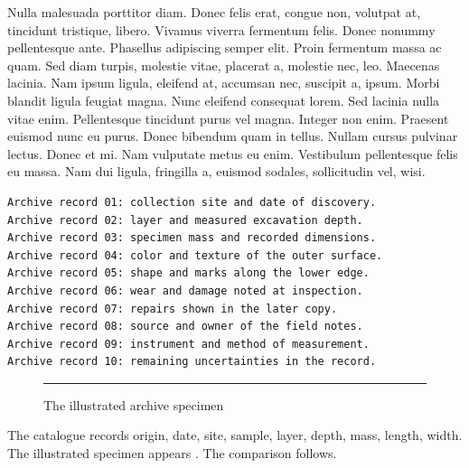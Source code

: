 \documentclass{article}
\begin{document}
Nulla malesuada porttitor diam. Donec felis erat, congue non, volutpat
at, tincidunt tristique, libero. Vivamus viverra fermentum felis. Donec
nonummy pellentesque ante. Phasellus adipiscing semper elit. Proin
fermentum massa ac quam. Sed diam turpis, molestie vitae, placerat a,
molestie nec, leo. Maecenas lacinia. Nam ipsum ligula, eleifend at,
accumsan nec, suscipit a, ipsum. Morbi blandit ligula feugiat magna.
Nunc eleifend consequat lorem. Sed lacinia nulla vitae enim.
Pellentesque tincidunt purus vel magna. Integer non enim. Praesent
euismod nunc eu purus. Donec bibendum quam in tellus. Nullam cursus
pulvinar lectus. Donec et mi. Nam vulputate metus eu enim. Vestibulum
pellentesque felis eu massa.
Nam dui ligula, fringilla a, euismod sodales, sollicitudin vel, wisi.
\begin{verbatim}
Archive record 01: collection site and date of discovery.
Archive record 02: layer and measured excavation depth.
Archive record 03: specimen mass and recorded dimensions.
Archive record 04: color and texture of the outer surface.
Archive record 05: shape and marks along the lower edge.
Archive record 06: wear and damage noted at inspection.
Archive record 07: repairs shown in the later copy.
Archive record 08: source and owner of the field notes.
Archive record 09: instrument and method of measurement.
Archive record 10: remaining uncertainties in the record.
\end{verbatim}
\begin{figure}[ht!]
  \rule{0pt}{5cm}\rule{5cm}{0pt}
  \caption{The illustrated archive specimen}
  \label{fig:specimen}
\end{figure}
\vspace{18pt}
The catalogue records origin, date, site, sample, layer, depth, mass, length, width. The illustrated specimen appears . The comparison follows.
\end{document}
